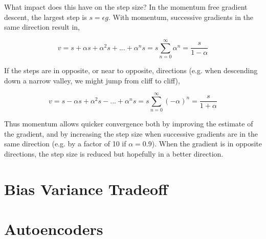 \documentclass{article}
\begin{document}
What impact does this have on the step size? In the momentum free gradient descent, the largest step is $s = \epsilon g$. With momentum, successive gradients in the same direction result in,

\begin{equation}
    v = s + \alpha s + \alpha^2 s + ... + \alpha^n s = s \sum_{n=0}^{\infty} \alpha^n = \frac{s}{1 - \alpha}
\end{equation}

If the steps are in opposite, or near to opposite, directions (e.g. when descending down a narrow valley, we might jump from cliff to cliff),

\begin{equation}
    v = s - \alpha s + \alpha^2 s - ... + \alpha^n s = s \sum_{n=0}^{\infty} (-\alpha)^n = \frac{s}{1 + \alpha}
\end{equation}

\noindent
Thus momentum allows quicker convergence both by improving the estimate of the gradient, and by increasing the step size when successive gradients are in the same direction (e.g. by a factor of 10 if $\alpha = 0.9$). When the gradient is in opposite directions, the step size is reduced but hopefully in a better direction.


\section{Bias Variance Tradeoff}



\section{Autoencoders}



\end{document}
